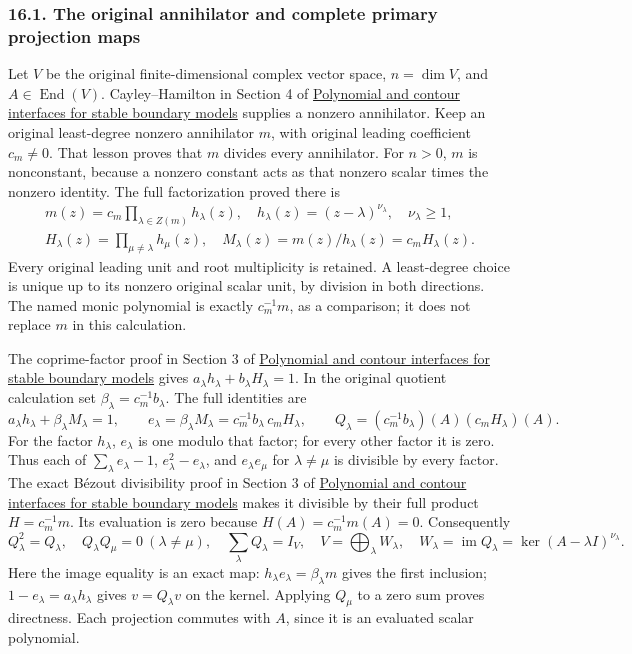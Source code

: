 \documentclass[
  11pt,
]{article}
\begin{document}
\subsubsection{16.1. The original annihilator and complete primary
projection
maps}\label{the-original-annihilator-and-complete-primary-projection-maps}

Let \(V\) be the original finite-dimensional complex vector space,
\(n=\dim V\), and \(A\in\operatorname{End}(V)\). Cayley--Hamilton in
Section 4 of \href{stable-prerequisite-bridges.pdf}{Polynomial and
contour interfaces for stable boundary models} supplies a nonzero
annihilator. Keep an original least-degree nonzero annihilator \(m\),
with original leading coefficient \(c_m\ne0\). That lesson proves that
\(m\) divides every annihilator. For \(n>0\), \(m\) is nonconstant,
because a nonzero constant acts as that nonzero scalar times the nonzero
identity. The full factorization proved there is \[
\begin{gathered}
m(z)=c_m\prod_{\lambda\in Z(m)}h_\lambda(z),\quad
 h_\lambda(z)=(z-\lambda)^{\nu_\lambda},\quad
 \nu_\lambda\geq1,\quad\\
 H_\lambda(z)=\prod_{\mu\ne\lambda}h_\mu(z),\quad
 M_\lambda(z)=m(z)/h_\lambda(z)=c_mH_\lambda(z).
\end{gathered} \tag{SR1}
\] Every original leading unit and root multiplicity is retained. A
least-degree choice is unique up to its nonzero original scalar unit, by
division in both directions. The named monic polynomial is exactly
\(c_m^{-1}m\), as a comparison; it does not replace \(m\) in this
calculation.

The coprime-factor proof in Section 3 of
\href{stable-prerequisite-bridges.pdf}{Polynomial and contour interfaces
for stable boundary models} gives
\(a_\lambda h_\lambda+b_\lambda H_\lambda=1\). In the original quotient
calculation set \(\beta_\lambda=c_m^{-1}b_\lambda\). The full identities
are \[
 a_\lambda h_\lambda+\beta_\lambda M_\lambda=1,\qquad
 e_\lambda=\beta_\lambda M_\lambda
              =c_m^{-1}b_\lambda\,c_mH_\lambda,\qquad
 Q_\lambda=(c_m^{-1}b_\lambda)(A)(c_mH_\lambda)(A).
                                                               \tag{SR2}
\] For the factor \(h_\lambda\), \(e_\lambda\) is one modulo that
factor; for every other factor it is zero. Thus each of
\(\sum_\lambda e_\lambda-1\), \(e_\lambda^2-e_\lambda\), and
\(e_\lambda e_\mu\) for \(\lambda\ne\mu\) is divisible by every factor.
The exact Bézout divisibility proof in Section 3 of
\href{stable-prerequisite-bridges.pdf}{Polynomial and contour interfaces
for stable boundary models} makes it divisible by their full product
\(H=c_m^{-1}m\). Its evaluation is zero because \(H(A)=c_m^{-1}m(A)=0\).
Consequently \[
 Q_\lambda^2=Q_\lambda,\quad Q_\lambda Q_\mu=0\ (\lambda\ne\mu),
 \quad\sum_\lambda Q_\lambda=I_V,\quad
 V=\bigoplus_\lambda W_\lambda,\quad
 W_\lambda=\operatorname{im}Q_\lambda
            =\ker(A-\lambda I)^{\nu_\lambda}.                  \tag{SR3}
\] Here the image equality is an exact map:
\(h_\lambda e_\lambda=\beta_\lambda m\) gives the first inclusion;
\(1-e_\lambda=a_\lambda h_\lambda\) gives \(v=Q_\lambda v\) on the
kernel. Applying \(Q_\mu\) to a zero sum proves directness. Each
projection commutes with \(A\), since it is an evaluated scalar
polynomial.
\end{document}
